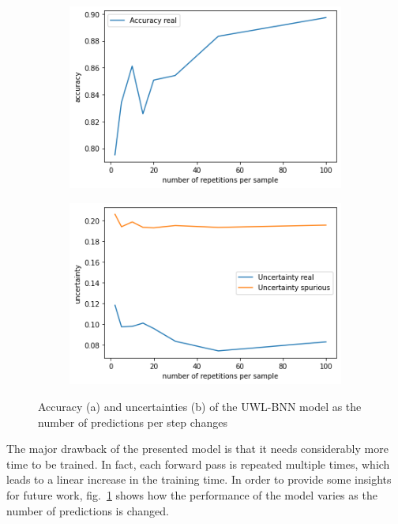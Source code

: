 \documentclass[11pt,twoside,a4paper]{article}
\begin{document}
\begin{figure}[!t]
    \centering
    \begin{subfigure}{0.49\textwidth}
	\includegraphics[width=\linewidth]{images/accuracy_preds.png}
        \caption{}
    \end{subfigure}
    \begin{subfigure}{0.49\textwidth}
	\includegraphics[width=\linewidth]{images/uc_preds.png}
        \caption{}
    \end{subfigure}
    \caption{Accuracy (a) and uncertainties (b) of the UWL-BNN model as the number of predictions per step changes}
    \label{fig:n_predictions}
\end{figure}

The major drawback of the presented model is that it needs considerably more time to be trained. In fact, each forward pass is repeated multiple times, which leads to a linear increase in the training time. In order to provide some insights for future work, fig.~\ref{fig:n_predictions} shows how the performance of the model varies as the number of predictions is changed.
\end{document}
